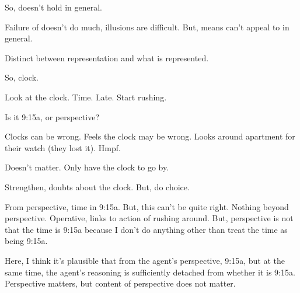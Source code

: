 \begin{note}
  So, doesn't hold in general.
\end{note}

\begin{note}
  Failure of \ptivity{} doesn't do much, illusions are difficult.
  But, means can't appeal to \ptivity{} in general.
\end{note}

\begin{note}
  Distinct between representation and what is represented.

  So, clock.

  Look at the clock.
  Time.
  Late.
  Start rushing.

  Is it 9:15a, or perspective?

  Clocks can be wrong.
  Feels the clock may be wrong.
  Looks around apartment for their watch (they lost it).
  Hmpf.

  Doesn't matter.
  Only have the clock to go by.

  Strengthen, doubts about the clock.
  But, do choice.

  From perspective, time in 9:15a.
  But, this can't be quite right.
  Nothing beyond perspective.
  Operative, links to action of rushing around.
  But, perspective is not that the time is 9:15a because I don't do anything other than treat the time as being 9:15a.

  Here, I think it's plausible that from the agent's perspective, 9:15a, but at the same time, the agent's reasoning is sufficiently detached from whether it is 9:15a.
  Perspective matters, but content of perspective does not matter.
\end{note}

